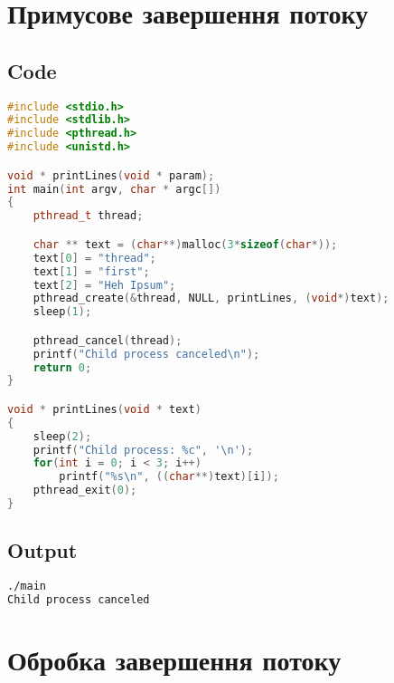 \documentclass{article}
\begin{document}
\newpage
\section{Примусове завершення потоку}
\subsection{Code}\vspace{-3mm}
\begin{lstlisting}[language=C++]
#include <stdio.h>
#include <stdlib.h>
#include <pthread.h>
#include <unistd.h>

void * printLines(void * param);
int main(int argv, char * argc[])
{
    pthread_t thread;

    char ** text = (char**)malloc(3*sizeof(char*));
    text[0] = "thread"; 
    text[1] = "first"; 
    text[2] = "Heh Ipsum";
    pthread_create(&thread, NULL, printLines, (void*)text);
    sleep(1);

    pthread_cancel(thread);
    printf("Child process canceled\n");
    return 0;
}

void * printLines(void * text)
{
    sleep(2);
    printf("Child process: %c", '\n');
    for(int i = 0; i < 3; i++)
        printf("%s\n", ((char**)text)[i]);
    pthread_exit(0);
}
\end{lstlisting}

\subsection{Output}\vspace{-3mm}
\begin{lstlisting}[language=BASH]
./main 
Child process canceled
\end{lstlisting}

\newpage

\section{Обробка завершення потоку}
\end{document}
